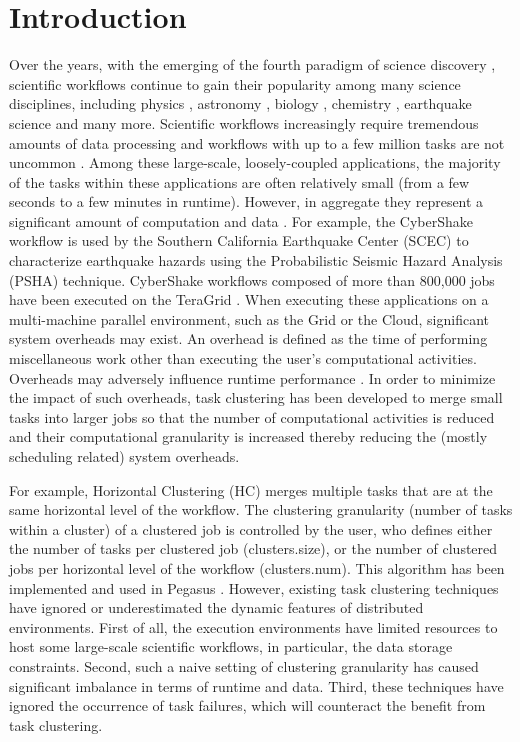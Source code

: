 \chapter{Introduction}


Over the years, with the emerging of the fourth paradigm of science discovery \cite{Hey2009}, scientific workflows continue to gain their popularity among many science disciplines, including physics \cite{Deelman2002}, astronomy \cite{Sakellariou2010}, biology \cite{Lathers2006, Oinn2004}, chemistry \cite{Wieczorek2005}, earthquake science \cite{Maechling2007} and many more. Scientific workflows increasingly require tremendous amounts of data processing and workflows with up to a few million tasks are not uncommon \cite{Callaghan2011}. Among these large-scale, loosely-coupled applications, the majority of the tasks within these applications are often relatively small (from a few seconds to a few minutes in runtime). However, in aggregate they represent a significant amount of computation and data \cite{Deelman2002}. For example, the CyberShake workflow \cite{Rynge2012} is used by the Southern California Earthquake Center (SCEC) \cite{SCEC} to characterize earthquake hazards using the Probabilistic Seismic Hazard Analysis (PSHA) technique. CyberShake workflows composed of more than 800,000 jobs have been executed on the TeraGrid \cite{TeraGrid}. When executing these applications on a multi-machine parallel environment, such as the Grid or the Cloud, significant system overheads may exist. An overhead is defined as the time of performing miscellaneous work other than executing the user's computational activities.  Overheads may adversely influence runtime performance \cite{Chen2011}. In order to minimize the impact of such overheads, task clustering \cite{Singh2008,Hussin2010,Zhao2009} has been developed to merge small tasks into larger jobs so that the number of computational activities is reduced and their computational granularity is increased thereby reducing the (mostly scheduling related) system overheads. %

For example, Horizontal Clustering (HC) merges multiple tasks that are at the same horizontal level of the workflow. The clustering granularity (number of tasks within a cluster) of a clustered job is controlled by the user, who defines either the number of tasks per clustered job (clusters.size), or the number of clustered jobs per horizontal level of the workflow (clusters.num). This algorithm has been implemented and used in Pegasus \cite{Singh2008}. However, existing task clustering techniques have ignored or underestimated the dynamic features of distributed environments. First of all,  the execution environments have limited resources to host some large-scale scientific workflows, in particular, the data storage constraints. Second, such a naive setting of clustering granularity has caused significant imbalance in terms of runtime and data. Third, these techniques have ignored the occurrence of task failures, which will counteract the benefit from task clustering. 

